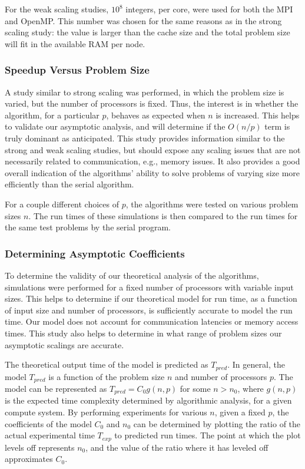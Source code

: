 \documentclass[12pt]{article}
\begin{document}
{{{For the weak scaling studies, $10^8$ integers, per core, were used for both the MPI
and OpenMP.  This number was chosen for the same reasons as in the strong scaling
study: the value is larger than the cache size and the total problem size will fit in
the available RAM per node.

\subsubsection{Speedup Versus Problem Size}

A study similar to strong scaling was performed, in which the problem size is varied,
but the number of processors is fixed.  Thus, the interest is in whether the
algorithm, for a particular $p$, behaves as expected when $n$ is increased.  This
helps to validate our asymptotic analysis, and will determine if the $O(n/p)$ term is
truly dominant as anticipated.  This study provides information similar to the strong and weak scaling studies, but
should expose any scaling issues that are not necessarily related to communication,
e.g., memory issues.
It also provides a good overall indication of the algorithms' ability to solve
problems of varying size more efficiently than the serial algorithm.

For a couple different choices of $p$, the algorithms were tested on various problem
sizes $n$. The run times of these simulations is then compared to the run times for
the same test problems by the serial program.  

\subsubsection{Determining Asymptotic Coefficients}

To determine the validity of our theoretical analysis of the algorithms, simulations
were performed for a fixed number of processors with variable input sizes.  This
helps to determine if our theoretical model for run time, as a function of input
size and number of processors, is sufficiently accurate to model the run time.  Our model does not account for
communication latencies or memory access times.  This study also helps to determine in what
range of problem sizes our asymptotic scalings are accurate.  

The theoretical output time of the model is predicted as $T_{pred}$. In general,
the model $T_{pred}$ is a function of the problem size $n$ and number of processors $p$.
The model can be represented as $T_{pred} = C_0 g(n,p)$ for some $n>n_0$, where
$g(n,p)$ is the expected time complexity determined by algorithmic analysis, for a given
compute system.  By performing experiments for various $n$, given a fixed $p$, the
coefficients of the model $C_0$ and $n_0$ can be determined by plotting the ratio of
the actual experimental time $T_{exp}$ to predicted run times.  The point at which
the plot levels off represents $n_0$, and the value of the ratio where it has leveled
off approximates $C_0$.

}}}
\end{document}
